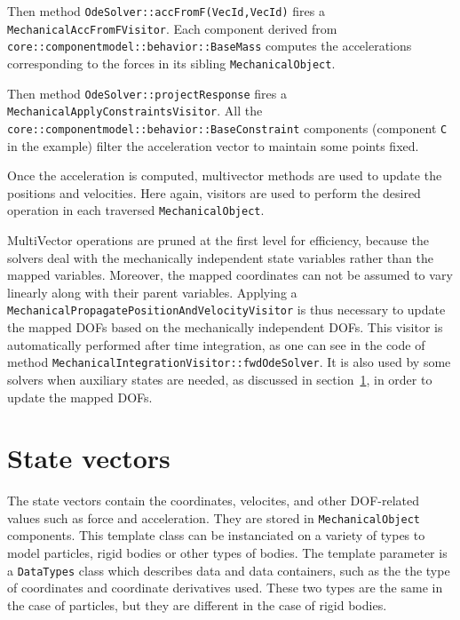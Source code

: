 Then method \texttt{OdeSolver::accFromF(VecId,VecId)} fires a \texttt{MechanicalAccFromFVisitor}. 
Each component derived from \texttt{core::componentmodel::behavior::BaseMass} computes the accelerations corresponding to the forces in its sibling \texttt{MechanicalObject}.

Then method \texttt{OdeSolver::projectResponse} fires a \texttt{MechanicalApplyConstraintsVisitor}. 
All the \texttt{core::componentmodel::behavior::BaseConstraint} components (component \texttt{C} in the example) filter the acceleration vector to maintain some points fixed.

Once the acceleration is computed, multivector methods are used to update the positions and velocities. 
Here again, visitors are used to perform the desired operation in each traversed \texttt{MechanicalObject}.

MultiVector operations are pruned at the first level for efficiency, because the solvers deal with the mechanically independent state variables rather than the mapped variables.
Moreover, the mapped coordinates can not be assumed to vary linearly along with their parent variables.
Applying a \\ \texttt{MechanicalPropagatePositionAndVelocityVisitor} is thus necessary to update the mapped DOFs based on the mechanically independent DOFs.
This visitor is automatically performed after time integration, as one can see in the code of method \texttt{MechanicalIntegrationVisitor::fwdOdeSolver}.
It is also used by some solvers when auxiliary states are needed, as discussed in section~\ref{sec:statevectors}, in order to update the mapped DOFs.



\section{State vectors} \label{sec:statevectors}
The state vectors contain the coordinates, velocites, and other DOF-related values such as force and acceleration.
They are stored in \texttt{MechanicalObject} components.
This template class can be instanciated on a variety of types to model particles, rigid bodies or other types of bodies.
The template parameter is a \texttt{DataTypes} class which describes data and data containers, such as the the type of coordinates and coordinate derivatives used.
These two types are the same in the case of particles, but they are different in the case of rigid bodies.

